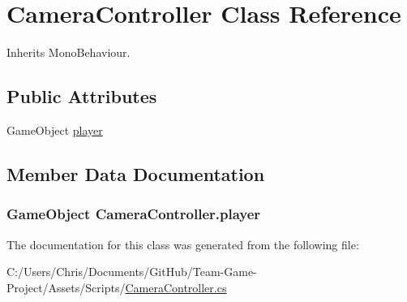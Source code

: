 \hypertarget{class_camera_controller}{}\section{Camera\+Controller Class Reference}
\label{class_camera_controller}


Inherits Mono\+Behaviour.

\subsection*{Public Attributes}
\begin{DoxyCompactItemize}
\item 
Game\+Object \hyperlink{class_camera_controller_aae794ec2d17947f671ce0eaef9aac8b7}{player}
\end{DoxyCompactItemize}


\subsection{Member Data Documentation}
\subsubsection[{\texorpdfstring{player}{player}}]{\setlength{\rightskip}{0pt plus 5cm}Game\+Object Camera\+Controller.\+player}\hypertarget{class_camera_controller_aae794ec2d17947f671ce0eaef9aac8b7}{}\label{class_camera_controller_aae794ec2d17947f671ce0eaef9aac8b7}


The documentation for this class was generated from the following file\+:\begin{DoxyCompactItemize}
\item 
C\+:/\+Users/\+Chris/\+Documents/\+Git\+Hub/\+Team-\/\+Game-\/\+Project/\+Assets/\+Scripts/\hyperlink{_camera_controller_8cs}{Camera\+Controller.\+cs}\end{DoxyCompactItemize}
